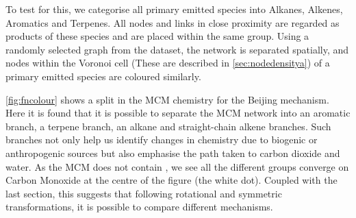 To test for this, we categorise all primary emitted species into Alkanes, Alkenes, Aromatics and Terpenes. All nodes and links in close proximity are regarded as products of these species and are placed within the same group. Using a randomly selected graph from the dataset, the network is separated spatially, and nodes within the Voronoi cell (These are described in \autoref{sec:nodedensitya}) of a primary emitted species are coloured similarly.

\autoref{fig:fncolour} shows a split in the MCM chemistry for the Beijing mechanism. Here it is found that it is possible to separate the MCM network into an aromatic branch, a terpene branch, an alkane and straight-chain alkene branches. Such branches not only help us identify changes in chemistry due to biogenic or anthropogenic sources but also emphasise the path taken to carbon dioxide and water. As the MCM does not contain , we see all the different groups converge on Carbon Monoxide at the centre of the figure (the white dot). Coupled with the last section, this suggests that following rotational and symmetric transformations, it is possible to compare  different mechanisms.

